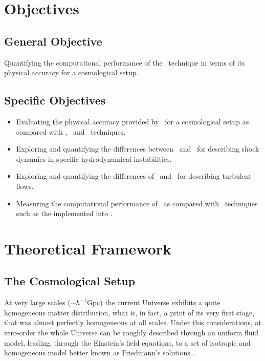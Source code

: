 \documentclass[a4,useAMS,usenatbib,usegraphicx,12pt]{article}
\begin{document}
\section{Objectives}
\subsection*{General Objective}
Quantifying the computational performance of the \VPH\ technique in terms of 
its physical accuracy for a cosmological setup.


\subsection*{Specific Objectives}
\begin{itemize}
\item Evaluating the physical accuracy provided by \VPH\ for a cosmological 
setup as compared with \SPH, \AMR\ and \IMM\ techniques.
\item Exploring and quantifying the differences between \VPH\ and \AMR\ for 
describing shock dynamics in specific hydrodynamical instabilities.
\item Exploring and quantifying the differences of \VPH\ and \SPH\ for 
describing turbulent flows.
\item Measuring the computational performance of \VPH\ as compared with \IMM\ 
techniques such as the implemented into \AREPO.
\end{itemize}


\section{Theoretical Framework}
\subsection*{The Cosmological Setup}
At very large scales ($\sim h^{-1}$Gpc) the current Universe exhibits a quite
homogeneous matter distribution, what is, in fact, a print of its very first 
stage, that was almost perfectly homogeneous at all scales. Under this 
considerations, at zero-order the whole Universe can be roughly described 
through an uniform fluid model, leading, through the Einstein's field equations,
to a set of isotropic and homogeneous model better known as Friedmann's 
solutions \citep{longair2008}.
\end{document}

